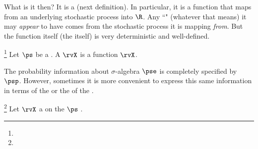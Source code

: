What is it then? It is a  (next definition).
In particular, it is a function that maps from an underlying stochastic process into $\R$.
Any ``" (whatever that means) it may \emph{appear} to have comes from the stochastic process it
is mapping \emph{from}. But the function itself (the  itself) is very deterministic and well-defined.
%
\begin{definition}
\footnote{
  }
Let $\ps$ be a  .
A  $\rvX$ is a function $\rvX$.
\end{definition}

The probability information about $\sigma$-algebra $\pse$ is completely
specified by  $\psp$.
However, sometimes it is more convenient to express this same 
information in terms of the  or the
 of the .
\begin{definition}
\footnote{
  }
\label{def:pdf}
\label{def:cdf}
Let $\rvX$ a  on the  $\ps$ .
\end{definition}

